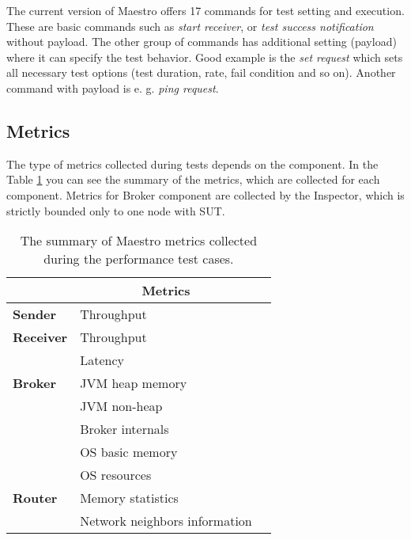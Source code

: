 \documentclass{ExcelAtFIT}
\begin{document}

The current version of Maestro offers 17 commands for test setting and execution\footnotemark{}. These are basic commands such as \emph{start receiver}, or \emph{test success notification} without payload. The other group of commands has additional setting (payload) where it can specify the test behavior. Good example is the \emph{set request} which sets all necessary test options (test duration, rate, fail condition and so on). Another command with payload is e. g. \emph{ping request}.


\subsection{Metrics}
\label{sec:Metrics}

The type of metrics collected during tests depends on the component. In the Table \ref{tab:maestro_metrics} you can see the summary of the metrics, which are collected for each component. Metrics for Broker component are collected by the Inspector, which is strictly bounded only to one node with SUT.


\begin{table}[h]
\caption{The summary of Maestro metrics collected during the performance test cases.}
\centering
\begin{tabular}{|p{2.5cm}|p{3.5cm}|p{7cm}|}
\hline
\rowcolor[HTML]{C5E3DF}
\multicolumn{1}{|c|}{\textbf{Component}} & \multicolumn{1}{c|}{\textbf{Metrics}} \\ \hline
\textbf{Sender}                          & Throughput                            \\ \hline
\textbf{Receiver}                        & Throughput                            \\ \hline
\textbf{}                                & Latency                               \\ \hline
\textbf{Broker}			                		 & JVM heap memory                       \\ \hline
                                         & JVM non-heap                          \\ \hline
                                         & Broker internals                      \\ \hline
                                         & OS basic memory                       \\ \hline
                                         & OS resources                          \\ \hline
 \textbf{Router}			                	 & Memory statistics                     \\ \hline
 											                	 & Network neighbors information    \\ \hline

\end{tabular}
\label{tab:maestro_metrics}
\end{table}
\end{document}
